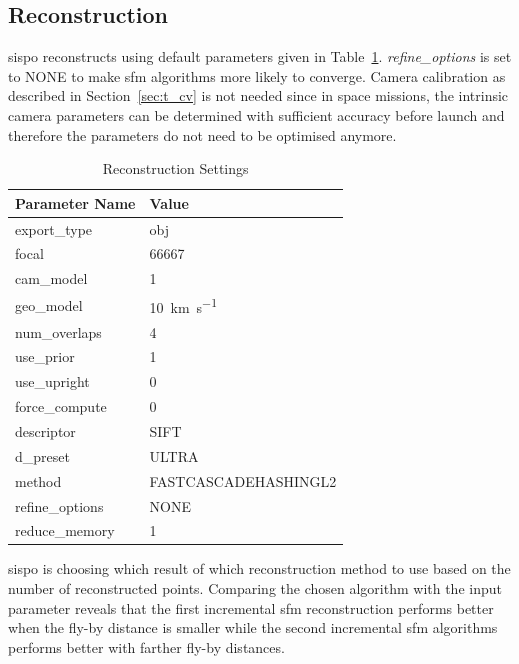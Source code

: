 \clearpage

\subsection{Reconstruction}
\gls{sispo} reconstructs using default parameters given in Table~\ref{tab:comp_settings}. \textit{refine\_options} is set to NONE to make \gls{sfm} algorithms more likely to converge. Camera calibration as described in Section~\ref{sec:t_cv} is not needed since in space missions, the intrinsic camera parameters can be determined with sufficient accuracy before launch and therefore the parameters do not need to be optimised anymore.

\begin{table}[htb]
    \centering
    \caption{Reconstruction Settings}
    \label{tab:comp_settings}
    \begin{tabular}{l|l}
        \textbf{Parameter Name} & \textbf{Value} \\ \hline
        export\_type       & obj   \\
        focal & 66667 \\
        cam\_model & \SI{1}{}     \\
        geo\_model & \SI{10}{\kilo\meter\per\second} \\
        num\_overlaps  & \SI{4}{} \\
        use\_prior & \SI{1}{} \\
        use\_upright & \SI{0}{} \\
        force\_compute & \SI{0}{} \\
        descriptor & SIFT \\
        d\_preset & ULTRA \\
        method & FASTCASCADEHASHINGL2 \\
        refine\_options & NONE \\
        reduce\_memory & 1
    \end{tabular}
\end{table}

\gls{sispo} is choosing which result of which reconstruction method to use based on the number of reconstructed points. Comparing the chosen algorithm with the input parameter reveals that the first incremental \gls{sfm} reconstruction performs better when the fly-by distance is smaller while the second incremental \gls{sfm} algorithms performs better with farther fly-by distances.

